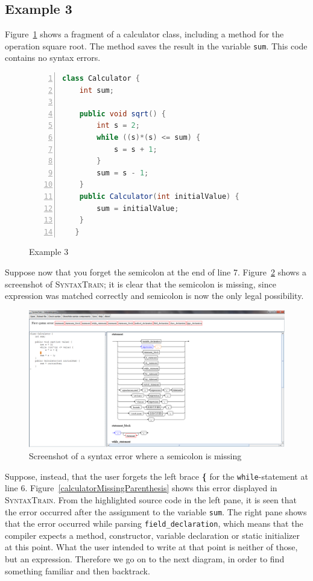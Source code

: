 \documentclass[11pt]{article}
\newcommand*{\st}{\textsc{SyntaxTrain}}
\begin{document}
\subsection{Example 3}

Figure~\ref{calculatorSourceCode} shows a fragment of a calculator
class, including a method for the operation square root. The method
saves the result in the variable \texttt{sum}. This code contains no
syntax errors.

\begin{figure}[htbp]
\begin{center}
\begin{lstlisting}[language=Java, numbers=left,numbersep=-10pt]
  class Calculator {
	int sum;
	
	public void sqrt() {
		int s = 2;
		while ((s)*(s) <= sum) {
			s = s + 1;
		}
		sum = s - 1;
	}
	public Calculator(int initialValue) {
		sum = initialValue;
	}
   }
\end{lstlisting}
\end{center}
\caption{Example 3}\label{calculatorSourceCode}
\end{figure}

Suppose now that you forget the semicolon at the end of line 7.
Figure~\ref{calculatorScreenshotMissingSemicolon} shows a screenshot of
\st{}; it is clear that the semicolon is missing, since expression was
matched correctly and semicolon is now the only legal possibility.

\begin{figure}[htbp]
\begin{center}
\includegraphics[width=.8\textwidth,keepaspectratio=fixed]{calculatorMissingSemicolon.png}
\end{center}
\caption{Screenshot of a syntax error where a semicolon is missing}\label{calculatorScreenshotMissingSemicolon}
\end{figure}

Suppose, instead, that the user forgets the left brace \textbf{\{} for
the \texttt{while}-statement at line 6.
Figure~\ref{calculatorMissingParenthesis} shows this error displayed in
\st{}. From the highlighted source code in the left pane, it is seen
that the error occurred after the assignment to the variable
\texttt{sum}. The right pane shows that the error occurred while parsing
\texttt{field\_declaration}, which means that the compiler expects a
method, constructor, variable declaration or static initializer at this
point. What the user intended to write at that point is neither of
those, but an expression. Therefore we go on to the next diagram, in
order to find something familiar and then backtrack.
\end{document}
